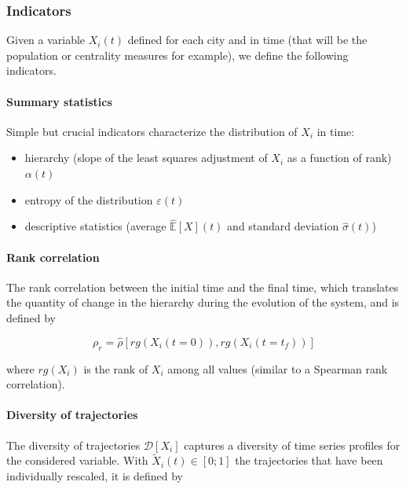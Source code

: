 \subsubsection{Indicators}

Given a variable $X_i(t)$ defined for each city and in time (that will be the population or centrality measures for example), we define the following indicators.

\paragraph{Summary statistics}

Simple but crucial indicators characterize the distribution of $X_i$ in time:
\begin{itemize}
	\item hierarchy (slope of the least squares adjustment of $X_i$ as a function of rank) $\alpha (t)$
	\item entropy of the distribution $\varepsilon (t)$
	\item descriptive statistics (average $\hat{\mathbb{E}}\left[X\right] (t)$ and standard deviation $\hat{\sigma} (t)$)
\end{itemize}


\paragraph{Rank correlation}

The rank correlation between the initial time and the final time, which translates the quantity of change in the hierarchy during the evolution of the system, and is defined by

\begin{equation}
\rho_r = \hat{\rho}\left[rg(X_i(t=0)),rg(X_i(t=t_f))\right]
\end{equation}

where $rg(X_i)$ is the rank of $X_i$ among all values (similar to a Spearman rank correlation).


\paragraph{Diversity of trajectories}

The diversity of trajectories $\mathcal{D}\left[X_i\right]$ captures a diversity of time series profiles for the considered variable. With $\tilde{X}_i(t)\in \left[0;1\right]$ the trajectories that have been individually rescaled, it is defined by

